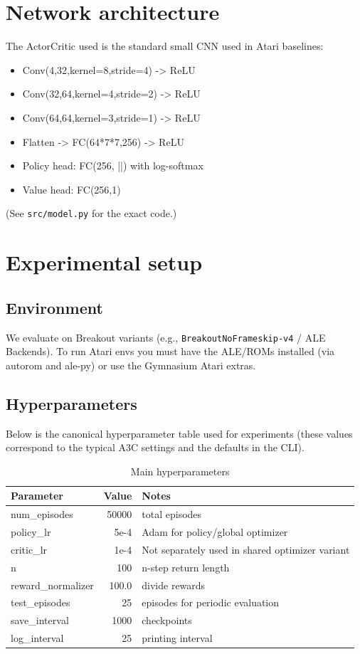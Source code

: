 \documentclass[11pt]{article}
\begin{document}
\section{Network architecture}
The ActorCritic used is the standard small CNN used in Atari baselines:
\begin{itemize}
  \item Conv(4,32,kernel=8,stride=4) -> ReLU
  \item Conv(32,64,kernel=4,stride=2) -> ReLU
  \item Conv(64,64,kernel=3,stride=1) -> ReLU
  \item Flatten -> FC(64*7*7,256) -> ReLU
  \item Policy head: FC(256, ||) with log-softmax
  \item Value head: FC(256,1)
\end{itemize}
(See \texttt{src/model.py} for the exact code.)

\section{Experimental setup}
\subsection{Environment}
We evaluate on Breakout variants (e.g., \texttt{BreakoutNoFrameskip-v4} / ALE Backends). To run Atari envs you must have the ALE/ROMs installed (via autorom and ale-py) or use the Gymnasium Atari extras.

\subsection{Hyperparameters}
Below is the canonical hyperparameter table used for experiments (these values correspond to the typical A3C settings and the defaults in the CLI).

\begin{table}[H]
\centering
\begin{tabular}{lrl}
\toprule
Parameter & Value & Notes \\
\midrule
num\_episodes & 50000 & total episodes \\
policy\_lr & 5e-4 & Adam for policy/global optimizer \\
critic\_lr & 1e-4 & Not separately used in shared optimizer variant \\
n & 100 & n-step return length \\
reward\_normalizer & 100.0 & divide rewards \\
test\_episodes & 25 & episodes for periodic evaluation \\
save\_interval & 1000 & checkpoints \\
log\_interval & 25 & printing interval \\
\bottomrule
\end{tabular}
\caption{Main hyperparameters}
\end{table}
\end{document}
